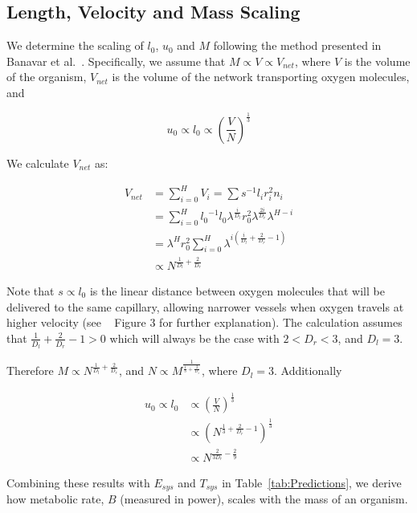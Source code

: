 \documentclass[12pt]{article}
\begin{document}
\subsection{Length, Velocity and Mass Scaling}
\label{subsec:appendixLengthMass}

We determine the scaling of $l_0$, $u_0$ and $M$ following the method 
presented in Banavar et al.~\cite{banavar10}. Specifically, we assume that $M
\propto V \propto V_{net}$, where $V$ is the volume of the organism, $V_{net}$ is the volume of the network
transporting oxygen molecules, and

\begin{equation}
u_0 \propto l_0 \propto \left (\frac{V}{N} \right) ^{\frac{1}{3}}
\end{equation}

We calculate $V_{net}$ as: 

\begin{align*}
V_{net} &= \sum_{i=0}^H V_i = \sum s^{-1} l_i r_i^2 n_i \\
  &= \sum_{i=0}^H {l_0}^{-1} l_0 \lambda^{\frac{i}{D_l}} r_0^2 \lambda^{\frac{2i}{D_r}}
  \lambda^{H-i} \\
  &= \lambda^H r_0^2 \sum_{i=0}^H \lambda^{i \left(\frac{i}{D_l} +
  \frac{2}{D_r} - 1 \right) } \\
  &\propto N^{\frac{1}{D_l} + \frac{2}{D_r}} 
\end{align*}

Note that $s \propto l_0$ is the linear distance between oxygen molecules that will be delivered to the same capillary, allowing narrower vessels when oxygen travels at higher velocity (see ~\cite{banavar10} Figure 3 for further explanation). The calculation assumes that $\frac{1}{D_l} + \frac{2}{D_r} -1 > 0$ which
will always be the case with $2 < D_r < 3$, and $D_l=3$. 

Therefore $M\propto N^{\frac{1}{D_l} +
\frac{2}{D_r}}$,
and $N \propto M^{\frac{1}{\frac{1}{3} + \frac{2}{D_r}}}$, where $D_l=3$.
Additionally

\begin{align*}
u_0 \propto l_0 & \propto \left( \frac{V}{N} \right)^{\frac{1}{3}} \\
    & \propto \left( N^{\frac{1}{3} + \frac{2}{D_r} - 1} \right)^{\frac{1}{3}} \\
    & \propto N^{\frac{2}{3D_r} - \frac{2}{9}}
\end{align*}

Combining these results with $E_{sys}$ and $T_{sys}$ in
Table~\ref{tab:Predictions}, we derive how metabolic rate, $B$
(measured in power), scales with the mass of an organism.
\end{document}
